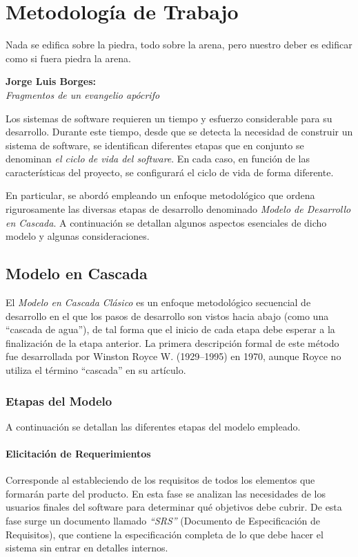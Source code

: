 \chapter{Metodología de Trabajo}

\epigraph{Nada se edifica sobre la piedra, todo
sobre la arena, pero nuestro deber es edificar
como si fuera piedra la arena.
}%
{\textbf{Jorge Luis Borges:} \\ \emph{Fragmentos de un evangelio apócrifo}}

\par Los sistemas de software requieren un tiempo y esfuerzo considerable para su desarrollo. Durante este tiempo, desde que se detecta la necesidad de construir un sistema de software, se identifican diferentes etapas que en conjunto se denominan \emph{el ciclo de vida del software}. En cada caso, en función de las características del proyecto, se configurará el ciclo de vida de forma diferente.
\par En particular, \remo se abordó empleando un enfoque metodológico que ordena rigurosamente las diversas etapas de desarrollo denominado \emph{Modelo de Desarrollo en Cascada}. A continuación se detallan algunos aspectos esenciales de dicho modelo y algunas consideraciones. 

\section{Modelo en Cascada}
\par El \emph{Modelo en Cascada Clásico} es un enfoque metodológico secuencial de desarrollo en el que los pasos de desarrollo son vistos hacia abajo (como una ``cascada de agua''), de tal forma que el inicio de cada etapa debe esperar a la finalización de la etapa anterior. La primera descripción formal de este método  fue desarrollada por Winston Royce W. (1929–1995) en 1970, aunque Royce no utiliza el término ``cascada'' en su artículo\cite{royce}. 

\subsection{Etapas del Modelo}
\label{modelo}
A continuación se detallan las diferentes etapas del modelo empleado.

\subsubsection{Elicitación de Requerimientos} 
\par Corresponde al estableciendo de los requisitos de todos los elementos que formarán parte del producto. En esta fase se analizan las necesidades de los usuarios finales del software para determinar qué objetivos debe cubrir. De esta fase surge un documento llamado \textit{``SRS''} (Documento de Especificación de Requisitos), que contiene la especificación completa de lo que debe hacer el sistema sin entrar en detalles internos.

